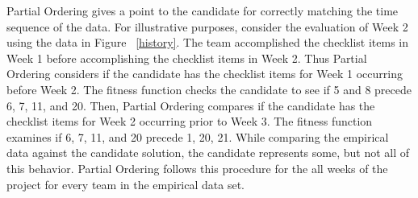 \documentclass[preprint,12pt,3p]{elsarticle}
\begin{document}
Partial Ordering gives a point to the candidate for correctly matching the time sequence of the data. For illustrative purposes, consider the evaluation of Week 2 using the data in Figure ~\ref{history}. The team accomplished the checklist items in Week 1 before accomplishing the checklist items in Week 2. Thus Partial Ordering considers if the candidate has the checklist items for Week 1 occurring before Week 2. The fitness function checks the candidate to see if 5 and 8 precede 6, 7, 11, and 20. Then, Partial Ordering compares if the candidate has the checklist items for Week 2 occurring prior to Week 3. The fitness function examines if 6, 7, 11, and 20 precede 1, 20, 21. While comparing the empirical data against the candidate solution, the candidate represents some, but not all of this behavior. Partial Ordering follows this procedure for the all weeks of the project for every team in the empirical data set. %


                                        
\end{document}
